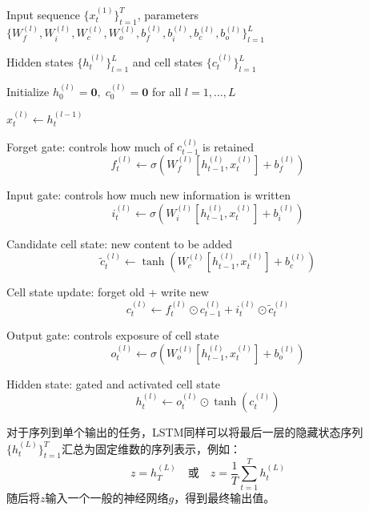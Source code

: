 \begin{algorithm}[H]
	\caption{Forward Propagation of a Multi-layer LSTM}
	\begin{algorithmic}[1]
		
		\Require Input sequence $\{x_t^{(1)}\}_{t=1}^T$, 
		parameters $\{W_f^{(l)},W_i^{(l)},W_c^{(l)},W_o^{(l)},b_f^{(l)},b_i^{(l)},b_c^{(l)},b_o^{(l)}\}_{l=1}^{L}$
		
		\Ensure Hidden states $\{h_t^{(l)}\}_{l=1}^{L}$ and cell states $\{c_t^{(l)}\}_{l=1}^{L}$
		
		\State Initialize $h_0^{(l)}=\mathbf{0},\; c_0^{(l)}=\mathbf{0}$ for all $l=1,\dots,L$
		
		 
		
		 
		
		\State $x_t^{(l)} \gets h_t^{(l-1)}$ 
		\EndIf
		
		\State Forget gate: controls how much of $c_{t-1}^{(l)}$ is retained
		\begin{equation*}
			f_t^{(l)} \gets \sigma\!\left(W_f^{(l)}[h_{t-1}^{(l)},x_t^{(l)}]+b_f^{(l)}\right)
		\end{equation*}
		
		\State Input gate: controls how much new information is written
		\begin{equation*}
			i_t^{(l)} \gets \sigma\!\left(W_i^{(l)}[h_{t-1}^{(l)},x_t^{(l)}]+b_i^{(l)}\right)
		\end{equation*}
		
		\State Candidate cell state: new content to be added
		\begin{equation*}
			\tilde c_t^{(l)} \gets \tanh\!\left(W_c^{(l)}[h_{t-1}^{(l)},x_t^{(l)}]+b_c^{(l)}\right)
		\end{equation*}
		
		\State Cell state update: forget old + write new
		\begin{equation*}
			c_t^{(l)} \gets f_t^{(l)}\odot c_{t-1}^{(l)} + i_t^{(l)}\odot \tilde c_t^{(l)}
		\end{equation*}
		
		\State Output gate: controls exposure of cell state
		\begin{equation*}
			o_t^{(l)} \gets \sigma\!\left(W_o^{(l)}[h_{t-1}^{(l)},x_t^{(l)}]+b_o^{(l)}\right)
		\end{equation*}
		
		\State Hidden state: gated and activated cell state
		\begin{equation*}
			h_t^{(l)} \gets o_t^{(l)}\odot \tanh(c_t^{(l)})
		\end{equation*}
		\EndFor
		\EndFor
	\end{algorithmic}
\end{algorithm}
对于序列到单个输出的任务，LSTM同样可以将最后一层的隐藏状态序列$\{h_t^{(L)}\}_{t=1}^{T}$汇总为固定维数的序列表示，例如：
\begin{equation*}
	z=h_T^{(L)}\quad\text{或}\quad z=\frac{1}{T}\sum_{t=1}^Th_t^{(L)}
\end{equation*}
随后将$z$输入一个一般的神经网络$g$，得到最终输出值。
